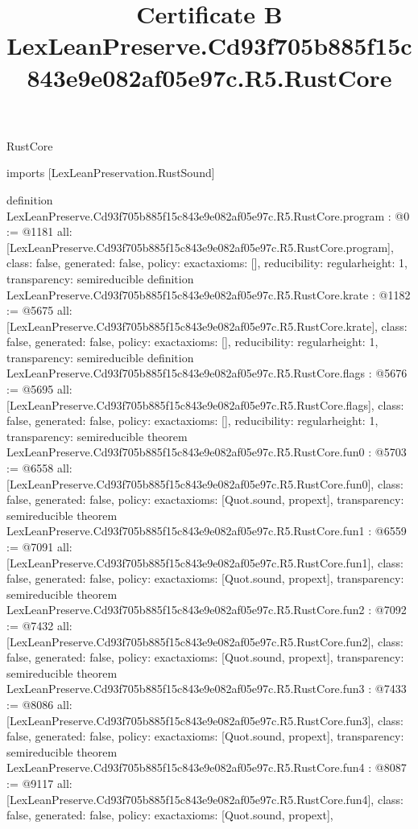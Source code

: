 \begin{lexlean}{RustCore}
\title{Certificate B LexLeanPreserve.Cd93f705b885f15c843e9e082af05e97c.R5.RustCore}
\begin{coremodule}
imports [LexLeanPreservation.RustSound]

definition LexLeanPreserve.Cd93f705b885f15c843e9e082af05e97c.R5.RustCore.program : @0 := @1181 {
  all: [LexLeanPreserve.Cd93f705b885f15c843e9e082af05e97c.R5.RustCore.program],
  class: false,
  generated: false,
  policy: exact{axioms: []},
  reducibility: regular{height: 1},
  transparency: semireducible
}
definition LexLeanPreserve.Cd93f705b885f15c843e9e082af05e97c.R5.RustCore.krate : @1182 := @5675 {
  all: [LexLeanPreserve.Cd93f705b885f15c843e9e082af05e97c.R5.RustCore.krate],
  class: false,
  generated: false,
  policy: exact{axioms: []},
  reducibility: regular{height: 1},
  transparency: semireducible
}
definition LexLeanPreserve.Cd93f705b885f15c843e9e082af05e97c.R5.RustCore.flags : @5676 := @5695 {
  all: [LexLeanPreserve.Cd93f705b885f15c843e9e082af05e97c.R5.RustCore.flags],
  class: false,
  generated: false,
  policy: exact{axioms: []},
  reducibility: regular{height: 1},
  transparency: semireducible
}
theorem LexLeanPreserve.Cd93f705b885f15c843e9e082af05e97c.R5.RustCore.fun0 : @5703 := @6558 {
  all: [LexLeanPreserve.Cd93f705b885f15c843e9e082af05e97c.R5.RustCore.fun0],
  class: false,
  generated: false,
  policy: exact{axioms: [Quot.sound, propext]},
  transparency: semireducible
}
theorem LexLeanPreserve.Cd93f705b885f15c843e9e082af05e97c.R5.RustCore.fun1 : @6559 := @7091 {
  all: [LexLeanPreserve.Cd93f705b885f15c843e9e082af05e97c.R5.RustCore.fun1],
  class: false,
  generated: false,
  policy: exact{axioms: [Quot.sound, propext]},
  transparency: semireducible
}
theorem LexLeanPreserve.Cd93f705b885f15c843e9e082af05e97c.R5.RustCore.fun2 : @7092 := @7432 {
  all: [LexLeanPreserve.Cd93f705b885f15c843e9e082af05e97c.R5.RustCore.fun2],
  class: false,
  generated: false,
  policy: exact{axioms: [Quot.sound, propext]},
  transparency: semireducible
}
theorem LexLeanPreserve.Cd93f705b885f15c843e9e082af05e97c.R5.RustCore.fun3 : @7433 := @8086 {
  all: [LexLeanPreserve.Cd93f705b885f15c843e9e082af05e97c.R5.RustCore.fun3],
  class: false,
  generated: false,
  policy: exact{axioms: [Quot.sound, propext]},
  transparency: semireducible
}
theorem LexLeanPreserve.Cd93f705b885f15c843e9e082af05e97c.R5.RustCore.fun4 : @8087 := @9117 {
  all: [LexLeanPreserve.Cd93f705b885f15c843e9e082af05e97c.R5.RustCore.fun4],
  class: false,
  generated: false,
  policy: exact{axioms: [Quot.sound, propext]},
}
\end{coremodule}
\end{lexlean}
